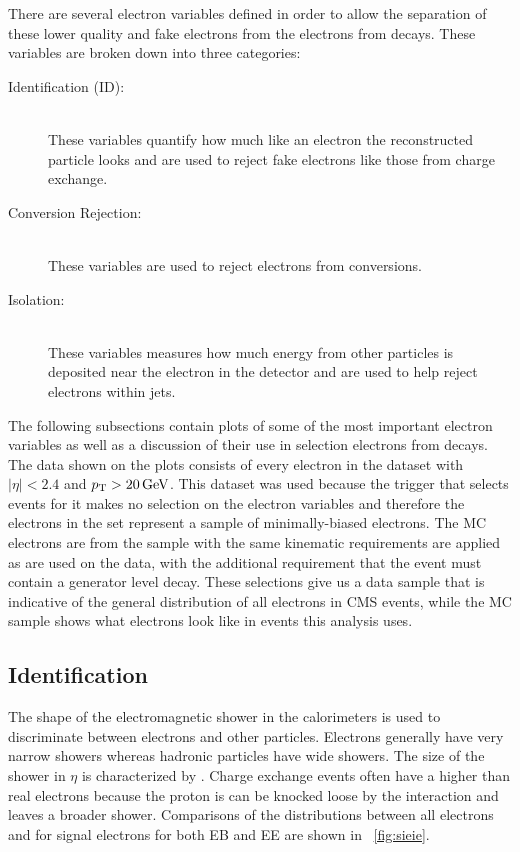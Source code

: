 There are several electron variables defined in order to allow the separation
of these lower quality and fake electrons from the electrons from \Ztoee
decays. These variables are broken down into three categories:

\begin{description}
    \item[Identification (ID):] \hfill \\
        These variables quantify how much like an electron the reconstructed
        particle looks and are used to reject fake electrons like those from
        charge exchange.
    \item[Conversion Rejection:] \hfill \\
        These variables are used to reject electrons from \PhotonConversion
        conversions.
    \item[Isolation:] \hfill \\
        These variables measures how much energy from other particles is
        deposited near the electron in the detector and are used to help reject
        electrons within jets.
\end{description}

The following subsections contain plots of some of the most important electron
variables as well as a discussion of their use in selection electrons from
\Ztoee decays. The data shown on the plots consists of every electron in the
\SingleMuon dataset with $|\eta| < 2.4$ and $p_{\mathrm{T}} > 20 \,\text{Ge\hspace{-.08em}V}$. This dataset was
used because the trigger that selects events for it makes no selection on the
electron variables and therefore the electrons in the set represent a sample of
minimally-biased electrons. The MC electrons are from the \MADGRAPH \DYtoll
sample with the same kinematic requirements are applied as are used on the
data, with the additional requirement that the event must contain a generator
level \Ztoee decay. These selections give us a data sample that is indicative
of the general distribution of all electrons in CMS events, while the MC sample
shows what electrons look like in events this analysis uses.

\subsection{Identification}

The shape of the electromagnetic shower in the calorimeters is used to
discriminate between electrons and other particles. Electrons generally have
very narrow showers whereas hadronic particles have wide showers. The size of
the shower in $\eta$ is characterized by \sigmaietaieta. Charge exchange events
often have a higher \sigmaietaieta than real electrons because the proton is
can be knocked loose by the interaction and leaves a broader shower.
Comparisons of the \sigmaietaieta distributions between all electrons and for
signal electrons for both EB and EE are shown in \FIG~\ref{fig:sieie}.

